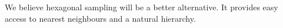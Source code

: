 We believe hexagonal sampling \citep{Middleton2001} will be a better
alternative. It provides easy access to nearest neighbours and a
natural hierarchy.






